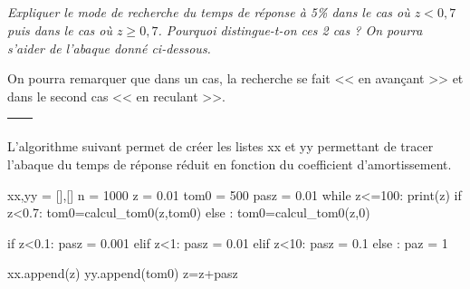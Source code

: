\documentclass[10pt]{article}
\newif\ifprof
\begin{document}
\fi

\newpage

\subparagraph{}
\textit{Expliquer le mode de recherche du temps de réponse à 5\% dans le cas où $z<0,7$ puis dans le cas où $z\geq 0,7$. Pourquoi distingue-t-on ces 2 cas ? On pourra s'aider de l'abaque donné ci-dessous.}

\ifprof
\else
\begin{rem}
On pourra remarquer que dans un cas, la recherche se fait << en avançant >> et dans le second cas << en reculant >>. 
\end{rem}


\begin{tabular}{|p{}|}
\hline
$$\quad$$
\vspace{1cm}
$$\quad$$ \\
\hline
\end{tabular}

\vspace{1cm}

\fi

\ifprof
\begin{corrige}
Pour déterminer le temps de réponse à 5\%, on cherche le dernier temps pour lequel, le signal est dans la bande à plus ou moins 5\%. En régime permanent, le signal est dans la bande. En << remontant le temps >> la première valeur hors de la bande correspond donc au temps de réponse recherché. 

Lorsque $\xi<0,7$, le système est oscillant, et le temps de réponse est mesuré lorsque les oscillations deviennent <<petites>>. Il est donc préférable de partir de la fin.

Lorsque $\xi>0,7$, on sait que dès lors que le signal entre dans la bande, il n'en sortira plus. Il est donc plus rapide de commencer par le début. 

\end{corrige}
\else
\fi

\ifprof
\else
L'algorithme suivant permet de créer les listes \textsf{xx} et \textsf{yy} permettant de tracer l'abaque du temps de réponse réduit en fonction du coefficient d'amortissement. 

\begin{py}
\begin{python}
xx,yy = [],[]
n = 1000
z = 0.01
tom0 = 500
pasz = 0.01
while z<=100:
    print(z)
    if z<0.7:
        tom0=calcul_tom0(z,tom0)
    else :
        tom0=calcul_tom0(z,0)
  
    if z<0.1:
        pasz = 0.001
    elif z<1:
        pasz = 0.01
    elif z<10:
        pasz = 0.1
    else :
        paz = 1
    
    xx.append(z)
    yy.append(tom0)
    z=z+pasz
\end{python}
\end{py}
\fi
\end{document}

